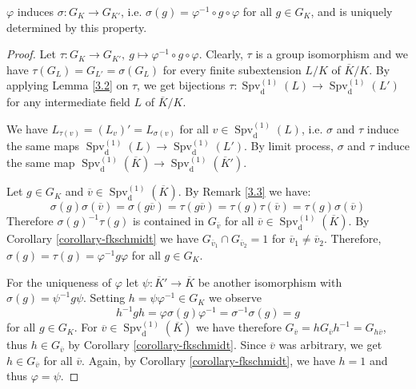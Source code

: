 \begin{step}
$\varphi$ induces $\sigma:G_K\to G_{K'}$, i.e. $\sigma(g) = \varphi^{-1}\circ g\circ \varphi$ for all $g\in G_K$, and is uniquely determined by this property.
\end{step}

\begin{proof}
Let $\tau:G_K\to G_{K'},\ g\mapsto \varphi^{-1}\circ g\circ \varphi$. Clearly, $\tau$ is a group isomorphism and we have $\tau(G_L)=G_{L'}=\sigma(G_L)$ for every finite subextension $L/K$ of $\overline{K}/K$. By applying Lemma \ref{3.2} on $\tau$, we get bijections $\tau: \operatorname{Spv}_\text{d}^{(1)}(L)\to \operatorname{Spv}_\text{d}^{(1)}(L')$ for any intermediate field $L$ of $\overline{K}/K$.

We have $L_{\tau(v)} = (L_v)' = L_{\sigma(v)}$ for all $v\in\operatorname{Spv}_\text{d}^{(1)}(L)$, i.e. $\sigma$ and $\tau$ induce the same maps $\operatorname{Spv}_\text{d}^{(1)}(L)\to \operatorname{Spv}_\text{d}^{(1)}(L')$. By limit process, $\sigma$ and $\tau$ induce the same map $\operatorname{Spv}_\text{d}^{(1)}(\overline{K})\to \operatorname{Spv}_\text{d}^{(1)}(\overline{K}')$.

Let $g\in G_K$ and $\overline{v}\in\operatorname{Spv}_\text{d}^{(1)}(\overline{K})$. By Remark \ref{3.3} we have:
\[ \sigma(g)\sigma(\overline{v}) = \sigma(g\overline{v}) = \tau(g\overline{v}) = \tau(g)\tau(\overline{v}) = \tau(g) \sigma(\overline{v}) \]
Therefore $\sigma(g)^{-1}\tau(g)$ is contained in $G_{\overline{v}}$ for all $\overline{v}\in\operatorname{Spv}_\text{d}^{(1)}(\overline{K})$. By Corollary \ref{corollary-fkschmidt} we have $G_{\overline{v}_1}\cap G_{\overline{v}_2} = 1$ for $\overline{v}_1\neq\overline{v}_2$. Therefore, $\sigma(g) = \tau(g) = \varphi^{-1}g\varphi$ for all $g\in G_K$.

For the uniqueness of $\varphi$ let $\psi: \overline{K}'\to \overline{K}$ be another isomorphism with $\sigma(g) = \psi^{-1} g \psi$. Setting $h = \psi\varphi^{-1}\in G_K$ we observe
\[ h^{-1}gh = \varphi\sigma(g)\varphi^{-1} = \sigma^{-1}\sigma(g) = g \]
for all $g\in G_K$. For $\overline{v}\in\operatorname{Spv}_\text{d}^{(1)}(\overline{K})$ we have therefore $G_{\overline{v}} = h G_{\overline{v}} h^{-1} = G_{h\overline{v}}$, thus $h\in G_{\overline{v}}$ by Corollary \ref{corollary-fkschmidt}. Since $\overline{v}$ was arbitrary, we get $h\in G_{\overline{v}}$ for all $\overline{v}$. Again, by Corollary \ref{corollary-fkschmidt}, we have $h=1$ and thus $\varphi = \psi$.
\end{proof}
